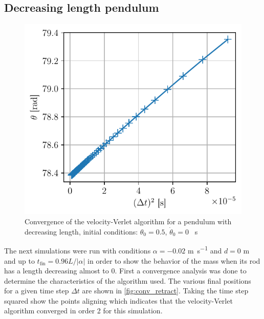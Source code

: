 \subsection{Decreasing length pendulum}
\begin{figure}
    \vspace*{-0.5cm}
    \centering
    \includegraphics[width=\linewidth]{figures/converg_retraction.pdf}
    \caption{Convergence of the velocity-Verlet algorithm for a pendulum with decreasing length, initial conditions: $\theta_0 = 0.5$, $\dot{\theta}_0 = 0$ \si{\per\second}}
    \label{fig:conv_retract}
    \vspace*{-1cm}
\end{figure}
The next simulations were run with conditions $\alpha=-0.02$ \si{\meter\per\second} and $d=0$ \si{\meter} and up to $t_\textrm{fin}=0.96L/|\alpha|$ in order to show the behavior of the mass when its rod has a length decreasing almost to 0. First a convergence analysis was done to determine the characteristics of the algorithm used. The various final positions for a given time step $\Delta t$ are shown in \autoref{fig:conv_retract}. Taking the time step squared show the points aligning which indicates that the velocity-Verlet algorithm converged in order 2 for this simulation.

